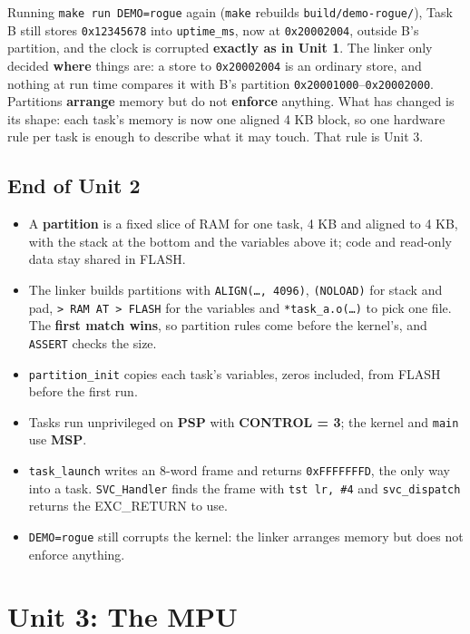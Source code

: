 Running \texttt{make run DEMO=rogue} again (\texttt{make} rebuilds \texttt{build/demo-rogue/}), Task B still stores \texttt{0x12345678} into \texttt{uptime\_ms}, now at \texttt{0x20002004}, outside B's partition, and the clock is corrupted \textbf{exactly as in Unit 1}. The linker only decided \textbf{where} things are: a store to \texttt{0x20002004} is an ordinary store, and nothing at run time compares it with B's partition \texttt{0x20001000}--\texttt{0x20002000}. Partitions \textbf{arrange} memory but do not \textbf{enforce} anything. What has changed is its shape: each task's memory is now one aligned 4 KB block, so one hardware rule per task is enough to describe what it may touch. That rule is Unit 3.

\subsection{End of Unit 2}

\begin{itemize}
    \item A \textbf{partition} is a fixed slice of RAM for one task, 4 KB and aligned to 4 KB, with the stack at the bottom and the variables above it; code and read-only data stay shared in FLASH.
    \item The linker builds partitions with \texttt{ALIGN(\dots, 4096)}, \texttt{(NOLOAD)} for stack and pad, \texttt{> RAM AT > FLASH} for the variables and \texttt{*task\_a.o(\dots)} to pick one file. The \textbf{first match wins}, so partition rules come before the kernel's, and \texttt{ASSERT} checks the size.
    \item \texttt{partition\_init} copies each task's variables, zeros included, from FLASH before the first run.
    \item Tasks run unprivileged on \textbf{PSP} with \textbf{CONTROL = 3}; the kernel and \texttt{main} use \textbf{MSP}.
    \item \texttt{task\_launch} writes an 8-word frame and returns \texttt{0xFFFFFFFD}, the only way into a task. \texttt{SVC\_Handler} finds the frame with \texttt{tst lr, \#4} and \texttt{svc\_dispatch} returns the EXC\_RETURN to use.
    \item \texttt{DEMO=rogue} still corrupts the kernel: the linker arranges memory but does not enforce anything.
\end{itemize}

\section{Unit 3: The MPU}

